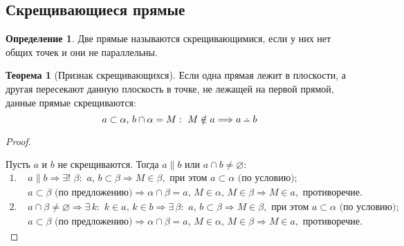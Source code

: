 \documentclass[12pt]{article}
\theoremstyle{definition}
\newtheorem{theorem}{Теорема}[section]
\newtheorem{definition}{Определение}
\providecommand{\dotdiv}{%
  \mathbin{%
    \vphantom{+}%
    \text{%
      \mathsurround=0pt %
      \ooalign{%
        \noalign{\kern-.25ex}%
        \hidewidth$\smash{\cdot}$\hidewidth\cr %
        \noalign{\kern.5ex}%
        $-$\cr %
      }%
    }%
  }%
}
\begin{document}
\subsection{Скрещивающиеся прямые}

\begin{definition}
    Две прямые называются скрещивающимися, если у них нет общих точек и они не параллельны.
\end{definition}

\begin{theorem}[Признак скрещивающихся]
    Если одна прямая лежит в плоскости, а другая пересекают данную плоскость в точке, не лежащей на первой прямой, данные прямые скрещиваются:
    $$a\subset\alpha,\,b\cap\alpha=M:\,\,M\notin a\Longrightarrow a\dotdiv b$$
\end{theorem}
\begin{proof}
    $ $\newline
    \begin{center}
    \end{center}
    Пусть $a$ и $b$ не скрещиваются. Тогда $a\parallel b$ или $a\cap b\neq\varnothing:
    $
    \begin{align*}
        1.\,\,&a\parallel b\Longrightarrow\exists!\,\,\beta:\,\,a,\,b\subset\beta\Longrightarrow M\in\beta,\text{ при этом }a\subset\alpha\text{ (по условию); }\\
        &a\subset\beta\text{ (по предложению)}\Longrightarrow \alpha\cap\beta=a,\,M\in\alpha,\,M\in\beta\Longrightarrow M\in a,\text{ противоречие.}\\
        2.\,\,&a\cap\beta\neq\varnothing\Longrightarrow\exists\,k:\,\,k\in a,\,k\in b\Longrightarrow\exists\,\beta:\,\,a,\,b\subset\beta\Longrightarrow M\in\beta,\text{ при этом }a\subset\alpha\text{ (по условию); }\\
        &a\subset\beta\text{ (по предложению)}\Longrightarrow \alpha\cap\beta=a,\,M\in\alpha,\,M\in\beta\Longrightarrow M\in a,\text{ противоречие.}
    \end{align*}
\end{proof}
\end{document}

